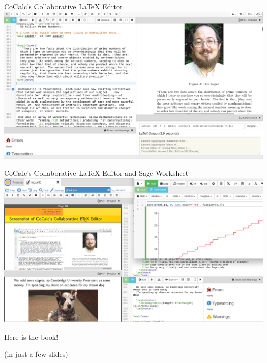 \documentclass{beamer}
\begin{document}
\begin{frame}{CoCalc's Collaborative \LaTeX{} Editor}
  \includegraphics[width=\textwidth]{pics/cocalc-latex}
\end{frame}

\begin{frame}{CoCalc's Collaborative \LaTeX{} Editor and Sage Worksheet}
  \includegraphics[width=\textwidth]{pics/cocalc-latex-2}
\end{frame}

\begin{frame}{}
  \vfill
  \begin{center}
    \hrulefill
    \vfill
    \Huge\sc Here is the book!
    \vfill
    \hrulefill
  \end{center}
  \vfill
  \begin{center}
    (in just a few slides)
  \end{center}
\end{frame}
\end{document}
